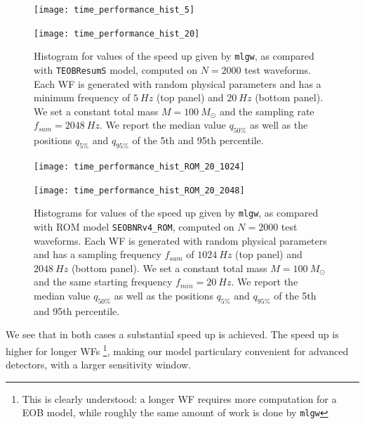 \newcommand{\factor}{.9}
\begin{figure}
	\centering
	\begin{minipage}{\factor\linewidth}
	    \texttt{[image: time\_performance\_hist\_5]}
	\end{minipage}\hfill
	\begin{minipage}{\factor\linewidth}
	    \texttt{[image: time\_performance\_hist\_20]}
	\end{minipage}

	\caption{
Histogram for values of the speed up given by \texttt{mlgw}, as compared with \texttt{TEOBResumS} model, computed on $N=2000$ test waveforms. Each WF is generated with random physical parameters and has a minimum frequency of $\SI{5}{Hz}$ (top panel) and $\SI{20}{Hz}$ (bottom panel).
We set a constant total mass $M=\SI{100}{M_\odot}$ and the sampling rate $f_{sam} = \SI{2048}{Hz}$.
We report the median value $q_{50\%}$ as well as the positions $q_{5\%}$ and $q_{95\%}$ of the 5th and 95th percentile.
}
	\label{fig:time_performance_hist}
\end{figure}
\begin{figure}
	\centering
	\begin{minipage}{\factor\linewidth}
	    \texttt{[image: time\_performance\_hist\_ROM\_20\_1024]}
	\end{minipage}\hfill
	\begin{minipage}{\factor\linewidth}
	    \texttt{[image: time\_performance\_hist\_ROM\_20\_2048]}
	\end{minipage}

	\caption{
Histograms for values of the speed up given by \texttt{mlgw}, as compared with ROM model \texttt{SEOBNRv4\_ROM}, computed on $N=2000$ test waveforms.
Each WF is generated with random physical parameters and has a sampling frequency $f_{sam}$ of $\SI{1024}{Hz}$ (top panel) and $\SI{2048}{Hz}$ (bottom panel).
We set a constant total mass $M=\SI{100}{M_\odot}$ and the same starting frequency $f_{min} = \SI{20}{Hz}$.
We report the median value $q_{50\%}$ as well as the positions $q_{5\%}$ and $q_{95\%}$ of the 5th and 95th percentile.
}
	\label{fig:time_performance_hist_ROM}
\end{figure}

We see that in both cases a substantial speed up is achieved. The speed up is higher for longer WFs
\footnote{This is clearly understood: a longer WF requires more computation for a EOB model, while roughly the same amount of work is done by \texttt{mlgw}}, 
making our model particulary convenient for advanced detectors, with a larger sensitivity window.
\par
